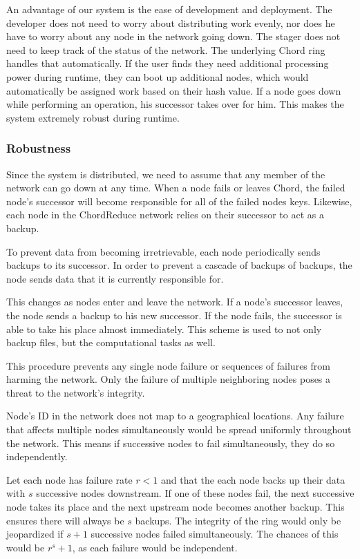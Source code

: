 An advantage of our system is the ease of development and deployment.  
The developer does not need to worry about distributing work evenly, nor does he have to worry about any node in the network going down. 
 The stager does not need to keep track of the status of the network.  
 The underlying Chord ring handles that automatically.  
 If the user finds they need additional processing power during runtime, they can boot up additional nodes, which would automatically be assigned work based on their hash value.   
 If a node goes down while performing an operation, his successor takes over for him.  
 This makes the system extremely robust during runtime.


\subsubsection{Robustness}
Since the system is distributed, we need to assume that any member of the network can go down at any time.
When a node fails or leaves Chord, the failed node's successor will become responsible for all of the failed nodes keys. 
Likewise, each node in the ChordReduce network relies on their successor to act as a backup.

To prevent data from becoming irretrievable, each node periodically sends backups to its successor.  
In order to prevent a cascade of backups of backups, the node sends data that it is currently responsible for.  

This changes as nodes enter and leave the network.  
If a node's successor leaves, the node sends a backup to his new successor.  
If the node fails, the successor is able to take his place almost immediately.  
This scheme is used to not only backup files, but the computational tasks as well.

This procedure prevents any single node failure or sequences of failures from harming the network. 
Only the failure of multiple neighboring nodes poses a threat to the network's integrity.  

Node's ID in the network does not map to a geographical locations.
Any failure that affects multiple nodes simultaneously would be spread uniformly throughout the network.
This means if successive nodes to fail simultaneously, they do so independently.

Let each node has failure rate $r < 1$ and that the each node backs up their data with $s$ successive nodes downstream. 
If one of these nodes fail, the next successive node takes its place and the next upstream node becomes another backup. 
This ensures there will always be $s$ backups. 
The integrity of the ring would only be jeopardized if $s+1$ successive nodes failed simultaneously.
The chances of this would be $r^s+1$, as each failure would be independent.


